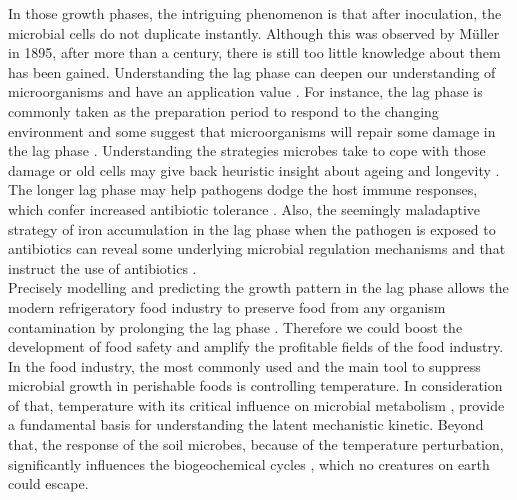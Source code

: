\documentclass[a4paper]{article}
\begin{document}
In those growth phases, the intriguing phenomenon is that after inoculation, the microbial cells do not duplicate instantly. Although this was observed by Müller in 1895, after more than a century, there is still too little knowledge about them has been gained. Understanding the lag phase can deepen our understanding of microorganisms and have an application value \citep{bertrand2019lag}. For instance, the lag phase is commonly taken as the preparation period to respond to the changing environment and some suggest that microorganisms will repair some damage in the lag phase \citep{rolfe2012lag}. Understanding the strategies microbes take to cope with those damage or old cells may give back heuristic insight about ageing and longevity \citep{pin2009network}. The longer lag phase may help pathogens dodge the host immune responses, which confer increased antibiotic tolerance \citep{li2016importance}. Also, the seemingly maladaptive strategy of iron accumulation in the lag phase when the pathogen is exposed to antibiotics can reveal some underlying microbial regulation mechanisms and that instruct the use of antibiotics \citep{rolfe2012lag}.\\

Precisely modelling and predicting the growth pattern in the lag phase allows the modern refrigeratory food industry to preserve food from any organism contamination by prolonging the lag phase \citep{swinnen2004predictive,perez201318,ghidelli2018recent,adams2020microbiology}. Therefore we could boost the development of food safety and amplify the profitable fields of the food industry. In the food industry, the most commonly used and the main tool to suppress microbial growth in perishable foods is controlling temperature. In consideration of that, temperature with its critical influence on microbial metabolism \citep{brown2004toward}, provide a fundamental basis for understanding the latent mechanistic kinetic. Beyond that, the response of the soil microbes, because of the temperature perturbation, significantly influences the biogeochemical cycles \citep{davidson2006temperature}, which no creatures on earth could escape. \\
\end{document}
